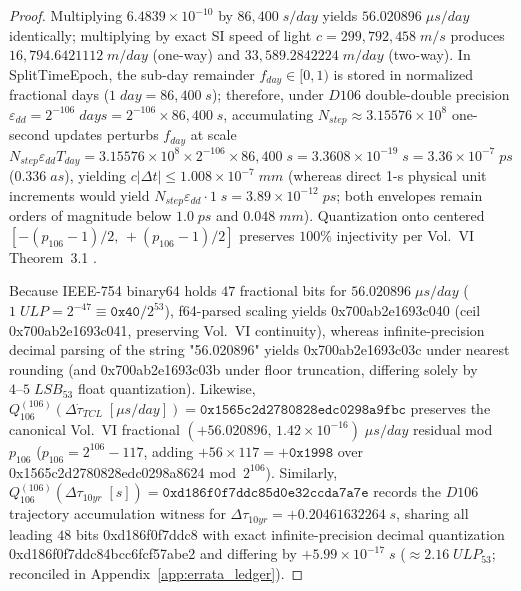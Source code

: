 \documentclass[11pt,a4paper,reqno]{article}
\def\texttt#1{#1}%
\def\mathrm#1{#1}%
\def\mathcal#1{#1}%
\def\mathbb#1{#1}%
\def\Done{D106}%
\theoremstyle{plain}
\theoremstyle{definition}
\theoremstyle{remark}
\numberwithin{equation}{section}
\numberwithin{table}{section}
\newcommand{\Done}{\mathbb{D}_{106}}
\begin{document}
\begin{proof}
Multiplying $6.4839 \times 10^{-10}$ by $86{,}400\;\mathrm{s/day}$ yields $56.020896\;\mu\mathrm{s/day}$ identically; multiplying by exact SI speed of light $c = 299{,}792{,}458\;\mathrm{m/s}$ produces $16{,}794.6421112\;\mathrm{m/day}$ (one-way) and $33{,}589.2842224\;\mathrm{m/day}$ (two-way). In \texttt{SplitTimeEpoch}, the sub-day remainder $f_{\mathrm{day}} \in [0, 1)$ is stored in normalized fractional days ($1\;\mathrm{day} = 86{,}400\;\mathrm{s}$); therefore, under $\Done$ double-double precision $\varepsilon_{\mathrm{dd}} = 2^{-106}\;\mathrm{days} = 2^{-106} \times 86{,}400\;\mathrm{s}$, accumulating $N_{\mathrm{step}} \approx 3.15576 \times 10^8$ one-second updates perturbs $f_{\mathrm{day}}$ at scale $N_{\mathrm{step}} \varepsilon_{\mathrm{dd}} T_{\mathrm{day}} = 3.15576\times 10^8 \times 2^{-106} \times 86{,}400\;\mathrm{s} = 3.3608 \times 10^{-19}\;\mathrm{s} = 3.36 \times 10^{-7}\;\mathrm{ps}$ ($0.336\;\mathrm{as}$), yielding $c|\Delta t| \le 1.008 \times 10^{-7}\;\mathrm{mm}$ (whereas direct 1-s physical unit increments would yield $N_{\mathrm{step}}\varepsilon_{\mathrm{dd}}\cdot 1\;\mathrm{s} = 3.89 \times 10^{-12}\;\mathrm{ps}$; both envelopes remain orders of magnitude below $1.0\;\mathrm{ps}$ and $0.048\;\mathrm{mm}$). Quantization onto centered $[-(p_{106}-1)/2,\, +(p_{106}-1)/2]$ preserves $100\%$ injectivity per Vol.~VI Theorem~3.1 \cite{AppliedPuristVol6Solinas2026}.

Because IEEE-754 \texttt{binary64} holds $47$ fractional bits for $56.020896\;\mu\mathrm{s/day}$ ($1\;\mathrm{ULP} = 2^{-47} \equiv \mathtt{0x40}/2^{53}$), \texttt{f64}-parsed scaling yields \texttt{0x700ab2e1\allowbreak 693c040} (ceil \texttt{0x700ab2e1\allowbreak 693c041}, preserving Vol.~VI continuity), whereas infinite-precision decimal parsing of the string \texttt{"56.020896"} yields \texttt{0x700ab2e1\allowbreak 693c03c} under nearest rounding (and \texttt{0x700ab2e1\allowbreak 693c03b} under floor truncation, differing solely by $4\text{--}5\;\mathrm{LSB}_{53}$ float quantization). Likewise, $\mathcal{Q}_{106}^{(106)}(\Delta\dot{\tau}_{\mathrm{TCL}}\;[\mu\mathrm{s/day}]) = \mathtt{0x1565\allowbreak c2d2\allowbreak 780828ed\allowbreak c0298a9fbc}$ preserves the canonical Vol.~VI fractional $(+56.020896,\,1.42\times 10^{-16})\;\mu\mathrm{s/day}$ residual mod~$p_{106}$ ($p_{106}=2^{106}-117$, adding $+56\times 117 = +\mathtt{0x1998}$ over \texttt{0x1565\allowbreak c2d2\allowbreak 780828ed\allowbreak c0298a8624} mod~$2^{106}$). Similarly, $\mathcal{Q}_{106}^{(106)}(\Delta\tau_{10\mathrm{yr}}\;[\mathrm{s}]) = \mathtt{0xd186\allowbreak f0f7\allowbreak ddc85d0e\allowbreak 32ccda7a7e}$ records the $\Done$ trajectory accumulation witness for $\Delta\tau_{10\mathrm{yr}} = +0.20461632264\;\mathrm{s}$, sharing all leading $48$ bits \texttt{0xd186\allowbreak f0f7ddc8} with exact infinite-precision decimal quantization \texttt{0xd186\allowbreak f0f7\allowbreak ddc84bcc\allowbreak 6fcf57abe2} and differing by $+5.99\times 10^{-17}\;\mathrm{s}$ ($\approx 2.16\;\mathrm{ULP}_{53}$; reconciled in Appendix~\ref{app:errata_ledger}).
\end{proof}
\end{document}
